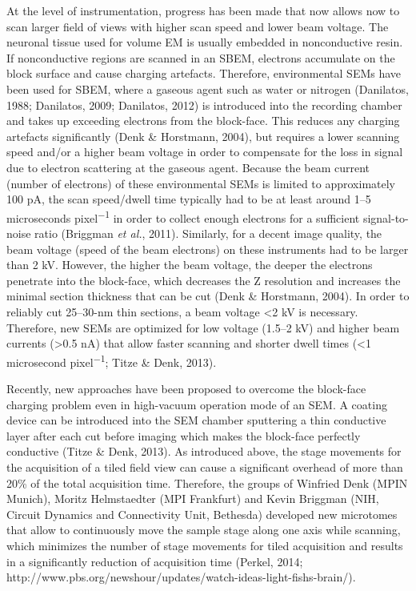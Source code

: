 \documentclass{article}
\begin{document}
At the level of instrumentation, progress has been made that now allows now to scan larger field of views with higher scan speed and lower beam voltage. The neuronal tissue used for volume EM is usually embedded in nonconductive resin. If nonconductive regions are scanned in an SBEM, electrons accumulate on the block surface and cause charging artefacts. Therefore, environmental SEMs have been used for SBEM, where a gaseous agent such as water or nitrogen (Danilatos, 1988; Danilatos, 2009; Danilatos, 2012) is introduced into the recording chamber and takes up exceeding electrons from the block-face. This reduces any charging artefacts significantly (Denk \& Horstmann, 2004), but requires a lower scanning speed and/or a higher beam voltage in order to compensate for the loss in signal due to electron scattering at the gaseous agent. Because the beam current (number of electrons) of these environmental SEMs is limited to approximately 100 pA, the scan speed/dwell time typically had to be at least around 1–5 microseconds pixel\textsuperscript{−1} in order to collect enough electrons for a sufficient signal-to-noise ratio (Briggman \emph{et al.}, 2011). Similarly, for a decent image quality, the beam voltage (speed of the beam electrons) on these instruments had to be larger than 2 kV. However, the higher the beam voltage, the deeper the electrons penetrate into the block-face, which decreases the Z resolution and increases the minimal section thickness that can be cut (Denk \& Horstmann, 2004). In order to reliably cut 25–30-nm thin sections, a beam voltage <2 kV is necessary. Therefore, new SEMs are optimized for low voltage (1.5–2 kV) and higher beam currents (>0.5 nA) that allow faster scanning and shorter dwell times (<1 microsecond pixel\textsuperscript{−1}; Titze \& Denk, 2013).

Recently, new approaches have been proposed to overcome the block-face charging problem even in high-vacuum operation mode of an SEM. A coating device can be introduced into the SEM chamber sputtering a thin conductive layer after each cut before imaging which makes the block-face perfectly conductive (Titze \& Denk, 2013). As introduced above, the stage movements for the acquisition of a tiled field view can cause a significant overhead of more than 20\% of the total acquisition time. Therefore, the groups of Winfried Denk (MPIN Munich), Moritz Helmstaedter (MPI Frankfurt) and Kevin Briggman (NIH, Circuit Dynamics and Connectivity Unit, Bethesda) developed new microtomes that allow to continuously move the sample stage along one axis while scanning, which minimizes the number of stage movements for tiled acquisition and results in a significantly reduction of acquisition time (Perkel, 2014; http://www.pbs.org/newshour/updates/watch-ideas-light-fishs-brain/).
\end{document}

